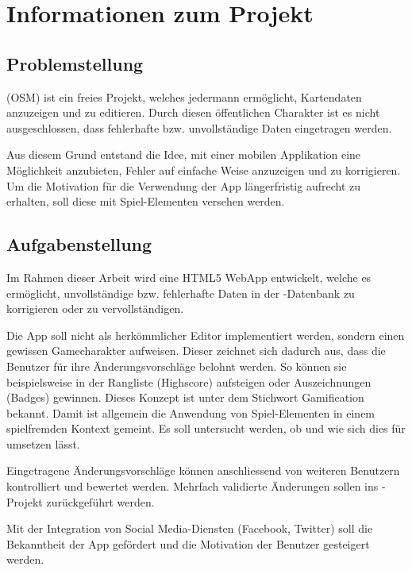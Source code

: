 \chapter{Informationen zum Projekt}
\label{informationen-projekt}


\section{Problemstellung}
 (OSM) ist ein freies Projekt, welches jedermann ermöglicht, Kartendaten anzuzeigen und zu editieren.
Durch diesen öffentlichen Charakter ist es nicht ausgeschlossen, dass fehlerhafte bzw. unvollständige Daten eingetragen werden.

Aus diesem Grund entstand die Idee, mit einer mobilen Applikation eine Möglichkeit anzubieten, Fehler auf einfache Weise anzuzeigen und zu korrigieren.
Um die Motivation für die Verwendung der App längerfristig aufrecht zu erhalten, soll diese mit Spiel-Elementen versehen werden.

\section{Aufgabenstellung}
Im Rahmen dieser Arbeit wird eine HTML5 \gls{WebApp} entwickelt, welche es ermöglicht, unvollständige bzw. fehlerhafte Daten in der -Datenbank zu korrigieren oder zu vervollständigen.

Die App soll nicht als herkömmlicher Editor implementiert werden, sondern einen gewissen Gamecharakter aufweisen.
Dieser zeichnet sich dadurch aus, dass die Benutzer für ihre Änderungsvorschläge belohnt werden.
So können sie beispielsweise in der Rangliste (Highscore) aufsteigen oder Auszeichnungen (Badges) gewinnen.
Dieses Konzept ist unter dem Stichwort \gls{Gamification} bekannt.
Damit ist allgemein die Anwendung von Spiel-Elementen in einem spielfremden Kontext gemeint.
Es soll untersucht werden, ob und wie sich dies für  umsetzen lässt.

Eingetragene Änderungsvorschläge können anschliessend von weiteren Benutzern kontrolliert und bewertet werden.
Mehrfach validierte Änderungen sollen ins -Projekt zurückgeführt werden.

Mit der Integration von Social Media-Diensten (Facebook, Twitter) soll die Bekanntheit der App gefördert und die Motivation der Benutzer gesteigert werden.

\cleardoublepage

